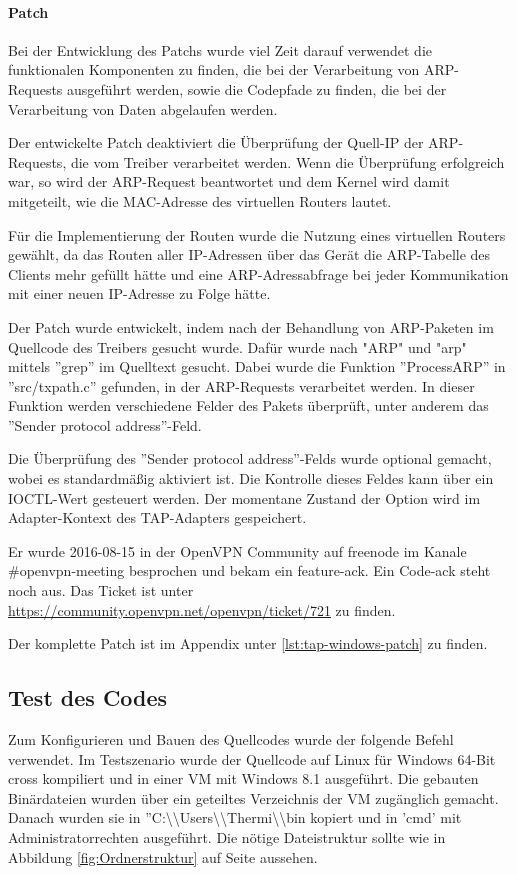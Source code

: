 \paragraph{Patch}
Bei der Entwicklung des Patchs wurde viel Zeit darauf verwendet die funktionalen
Komponenten zu finden, die bei der Verarbeitung von \ac{ARP}-Requests ausgeführt werden,
sowie die Codepfade zu finden, die bei der Verarbeitung von Daten abgelaufen werden.

Der entwickelte Patch deaktiviert die Überprüfung der Quell-IP der \ac{ARP}-Requests, die
vom Treiber verarbeitet werden. Wenn die Überprüfung erfolgreich war, so wird der ARP-Request
beantwortet und dem Kernel wird damit mitgeteilt, wie die MAC-Adresse des virtuellen Routers lautet.

Für die Implementierung der Routen wurde die Nutzung eines virtuellen Routers gewählt,
da das Routen aller \ac{IP}-Adressen über das Gerät die \ac{ARP}-Tabelle des Clients
mehr gefüllt hätte und eine \ac{ARP}-Adressabfrage bei jeder Kommunikation mit einer neuen
\ac{IP}-Adresse zu Folge hätte.

Der Patch wurde entwickelt, indem nach der Behandlung von \ac{ARP}-Paketen im
Quellcode des Treibers gesucht wurde. Dafür wurde nach "ARP" und "arp" mittels
''grep'' im Quelltext gesucht. Dabei wurde die Funktion ''ProcessARP'' in ''src/txpath.c''
gefunden, in der \ac{ARP}-Requests verarbeitet werden. In dieser Funktion
werden verschiedene Felder des Pakets überprüft, unter anderem das ''Sender protocol address''-Feld.

Die Überprüfung des ''Sender protocol address''-Felds wurde optional gemacht, 
wobei es standardmäßig aktiviert ist. Die Kontrolle dieses
Feldes kann über ein IOCTL-Wert gesteuert werden. Der momentane Zustand der Option
wird im Adapter-Kontext des TAP-Adapters gespeichert.

Er wurde 2016-08-15 in der OpenVPN Community auf freenode im Kanale \#openvpn-meeting besprochen
und bekam ein feature-ack. Ein Code-ack steht noch aus. Das Ticket ist unter
\url{https://community.openvpn.net/openvpn/ticket/721} zu finden.

Der komplette Patch ist im Appendix unter \autoref{lst:tap-windows-patch} zu finden.


\subsection{Test des Codes}
Zum Konfigurieren und Bauen des Quellcodes wurde der folgende Befehl verwendet.
Im Testszenario wurde der Quellcode auf Linux für Windows 64-Bit cross kompiliert
und in einer \ac{VM} mit Windows 8.1 ausgeführt.
Die gebauten Binärdateien wurden über ein geteiltes Verzeichnis der \ac{VM}
zugänglich gemacht. Danach wurden sie in ''C:\textbackslash{}\textbackslash{}Users\textbackslash{}\textbackslash{}Thermi\textbackslash{}\textbackslash{}bin
kopiert und in 'cmd' mit Administratorrechten ausgeführt. 
Die nötige Dateistruktur sollte wie in Abbildung \ref{fig:Ordnerstruktur} 
auf Seite \pageref{fig:Ordnerstruktur} aussehen.

